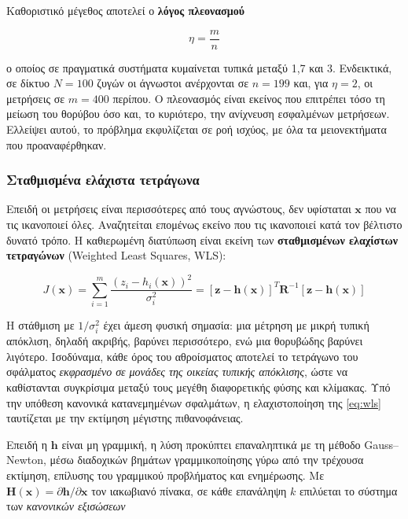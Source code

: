 Καθοριστικό μέγεθος αποτελεί ο \textbf{λόγος πλεονασμού}

\begin{equation}
\eta = \frac{m}{n}
\label{eq:redundancy}
\end{equation}

ο οποίος σε πραγματικά συστήματα κυμαίνεται τυπικά μεταξύ 1,7 και 3. Ενδεικτικά, σε δίκτυο
$N = 100$ ζυγών οι άγνωστοι ανέρχονται σε $n = 199$ και, για $\eta = 2$, οι μετρήσεις σε
$m = 400$ περίπου. Ο πλεονασμός είναι εκείνος που επιτρέπει τόσο τη μείωση του θορύβου όσο
και, το κυριότερο, την ανίχνευση εσφαλμένων μετρήσεων. Ελλείψει αυτού, το πρόβλημα
εκφυλίζεται σε ροή ισχύος, με όλα τα μειονεκτήματα που προαναφέρθηκαν.

\subsubsection*{Σταθμισμένα ελάχιστα τετράγωνα}

Επειδή οι μετρήσεις είναι περισσότερες από τους αγνώστους, δεν υφίσταται $\mathbf{x}$ που
να τις ικανοποιεί όλες. Αναζητείται επομένως εκείνο που τις ικανοποιεί κατά τον βέλτιστο
δυνατό τρόπο. Η καθιερωμένη διατύπωση είναι εκείνη των \textbf{σταθμισμένων ελαχίστων
τετραγώνων} (Weighted Least Squares, WLS):

\begin{equation}
J(\mathbf{x}) = \sum_{i=1}^{m} \frac{\left(z_i - h_i(\mathbf{x})\right)^2}{\sigma_i^2}
             = \left[\mathbf{z}-\mathbf{h}(\mathbf{x})\right]^{T} \mathbf{R}^{-1}
               \left[\mathbf{z}-\mathbf{h}(\mathbf{x})\right]
\label{eq:wls}
\end{equation}

Η στάθμιση με $1/\sigma_i^2$ έχει άμεση φυσική σημασία: μια μέτρηση με μικρή τυπική
απόκλιση, δηλαδή ακριβής, βαρύνει περισσότερο, ενώ μια θορυβώδης βαρύνει λιγότερο.
Ισοδύναμα, κάθε όρος του αθροίσματος αποτελεί το τετράγωνο του σφάλματος \emph{εκφρασμένο
σε μονάδες της οικείας τυπικής απόκλισης}, ώστε να καθίστανται συγκρίσιμα μεταξύ τους
μεγέθη διαφορετικής φύσης και κλίμακας. Υπό την υπόθεση κανονικά κατανεμημένων σφαλμάτων,
η ελαχιστοποίηση της \eqref{eq:wls} ταυτίζεται με την εκτίμηση μέγιστης πιθανοφάνειας.

Επειδή η $\mathbf{h}$ είναι μη γραμμική, η λύση προκύπτει επαναληπτικά με τη μέθοδο
Gauss--Newton, μέσω διαδοχικών βημάτων γραμμικοποίησης γύρω από την τρέχουσα εκτίμηση,
επίλυσης του γραμμικού προβλήματος και ενημέρωσης. Με
$\mathbf{H}(\mathbf{x}) = \partial \mathbf{h}/\partial \mathbf{x}$ τον ιακωβιανό πίνακα, σε
κάθε επανάληψη $k$ επιλύεται το σύστημα των \emph{κανονικών εξισώσεων}

